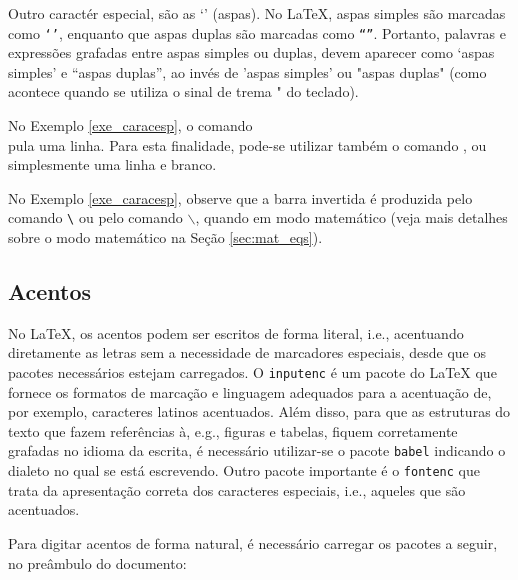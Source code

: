 Outro caractér especial, são as `' (aspas). No \LaTeX{}, aspas simples são marcadas como \texttt{`'}, enquanto que aspas duplas são marcadas como \texttt{``''}. Portanto, palavras e expressões grafadas entre aspas simples ou duplas, devem aparecer como `aspas simples' e ``aspas duplas'', ao invés de 'aspas simples' ou "aspas duplas"  (como acontece quando se utiliza o sinal de trema "  do teclado).

\begin{marker}
  No Exemplo \ref{exe_caracesp}, o comando \texttt{\\} pula uma linha. Para esta finalidade, pode-se utilizar também o comando \texttt{\newline}, ou simplesmente uma linha e branco.
\end{marker}

No Exemplo \ref{exe_caracesp}, observe que a barra invertida é produzida pelo comando \texttt{\textbackslash} ou pelo comando  \texttt{$\backslash$}, quando em modo matemático (veja mais detalhes sobre o modo matemático na Seção \ref{sec:mat_eqs}).

\subsection{Acentos}
\label{sec:acentos}

No \LaTeX{}, os acentos podem ser escritos de forma literal, i.e., acentuando diretamente as letras sem a necessidade de marcadores especiais, desde que os pacotes necessários estejam carregados. O {\tt inputenc} é um pacote do \LaTeX{} que fornece os formatos de marcação e linguagem adequados para a acentuação de, por exemplo, caracteres latinos acentuados. Além disso, para que as estruturas do texto que fazem referências à, e.g., figuras e tabelas, fiquem corretamente grafadas no idioma da escrita, é necessário utilizar-se o pacote {\tt babel} indicando o dialeto no qual se está escrevendo. Outro pacote importante é o {\tt fontenc} que trata da apresentação correta dos caracteres especiais, i.e., aqueles que são acentuados.

Para digitar acentos de forma natural, é necessário carregar os pacotes a seguir, no preâmbulo do documento:

\begin{itemize}
    \item \texttt{\usepackage[brazilian]{babel}}
    \item \texttt{\usepackage[T1]{fontenc}}
    \item \texttt{\usepackage[utf8]{inputenc}}\footnotemark[1]
\end{itemize}

